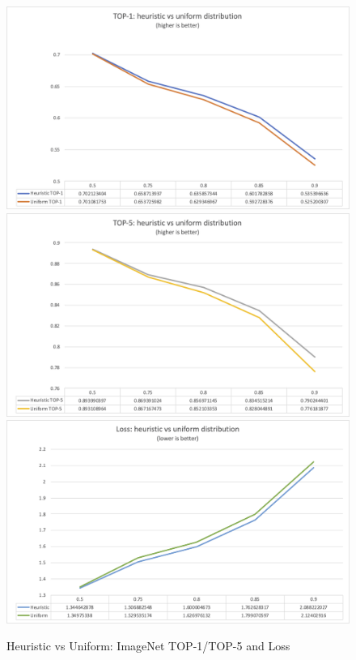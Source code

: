 \begin{figure}
    \centering
    {\includegraphics[width=.85\linewidth]{images/experiments/imagenet_top1.png}}
    {\includegraphics[width=.85\linewidth]{images/experiments/imagenet_top5.png}}
    {\includegraphics[width=.85\linewidth]{images/experiments/imagenet_loss.png}}
    \caption{Heuristic vs Uniform: ImageNet TOP-1/TOP-5 and Loss}\label{fig:imagenet_top1_top5_loss}
\end{figure}

